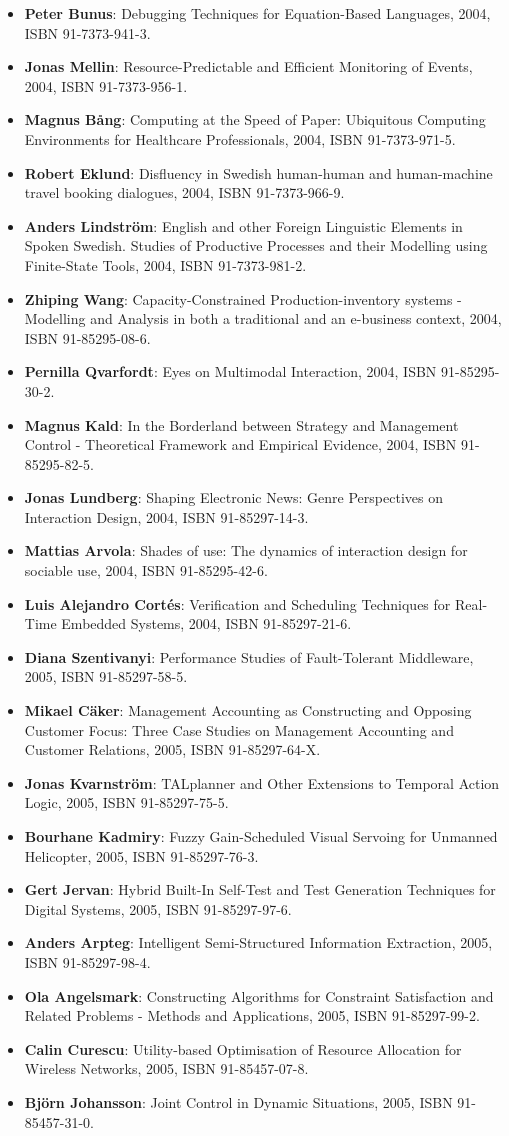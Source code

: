 \documentclass[a4paper,showtrims,twocolumn]{memoir}
\newenvironment{theses}
  {
    \begin{itemize}
      \setlength{\itemsep}{0.2em}
      \setlength{\parskip}{0em}
      \setlength{\parsep}{0em}
  }
  {
    \end{itemize}
  }
\newcommand{\thesis}[5]{\item[No. #1] \textbf{#2}: #3, #4, ISBN #5.}
\begin{document}
\begin{theses}
    \thesis{873}{Peter Bunus}{Debugging Techniques for Equation-Based Languages}{2004}{91-7373-941-3}
    \thesis{876}{Jonas Mellin}{Resource-Predictable and Efficient Monitoring of Events}{2004}{91-7373-956-1}
    \thesis{883}{Magnus Bång}{Computing at the Speed of Paper: Ubiquitous Computing Environments for Healthcare Professionals}{2004}{91-7373-971-5}
    \thesis{882}{Robert Eklund}{Disfluency in Swedish human-human and human-machine travel booking dialogues}{2004}{91-7373-966-9}
    \thesis{887}{Anders Lindström}{English and other Foreign Linguistic Elements in Spoken Swedish. Studies of Productive Processes and their Modelling using Finite-State Tools}{2004}{91-7373-981-2}
    \thesis{889}{Zhiping Wang}{Capacity-Constrained Production-inventory systems - Modelling and Analysis in both a traditional and an e-business context}{2004}{91-85295-08-6}
    \thesis{893}{Pernilla Qvarfordt}{Eyes on Multimodal Interaction}{2004}{91-85295-30-2}
    \thesis{910}{Magnus Kald}{In the Borderland between Strategy and Management Control - Theoretical Framework and Empirical Evidence}{2004}{91-85295-82-5}
    \thesis{918}{Jonas Lundberg}{Shaping Electronic News: Genre Perspectives on Interaction Design}{2004}{91-85297-14-3}
    \thesis{900}{Mattias Arvola}{Shades of use: The dynamics of interaction design for sociable use}{2004}{91-85295-42-6}
    \thesis{920}{Luis Alejandro Cortés}{Verification and Scheduling Techniques for Real-Time Embedded Systems}{2004}{91-85297-21-6}
    \thesis{929}{Diana Szentivanyi}{Performance Studies of Fault-Tolerant Middleware}{2005}{91-85297-58-5}
    \thesis{933}{Mikael Cäker}{Management Accounting as Constructing and Opposing Customer Focus: Three Case Studies on Management Accounting and Customer Relations}{2005}{91-85297-64-X}
    \thesis{937}{Jonas Kvarnström}{TALplanner and Other Extensions to Temporal Action Logic}{2005}{91-85297-75-5}
    \thesis{938}{Bourhane Kadmiry}{Fuzzy Gain-Scheduled Visual Servoing for Unmanned Helicopter}{2005}{91-85297-76-3}
    \thesis{945}{Gert Jervan}{Hybrid Built-In Self-Test and Test Generation Techniques for Digital Systems}{2005}{91-85297-97-6}
    \thesis{946}{Anders Arpteg}{Intelligent Semi-Structured Information Extraction}{2005}{91-85297-98-4}
    \thesis{947}{Ola Angelsmark}{Constructing Algorithms for Constraint Satisfaction and Related Problems - Methods and Applications}{2005}{91-85297-99-2}
    \thesis{963}{Calin Curescu}{Utility-based Optimisation of Resource Allocation for Wireless Networks}{2005}{91-85457-07-8}
    \thesis{972}{Björn Johansson}{Joint Control in Dynamic Situations}{2005}{91-85457-31-0}

\end{theses}
\end{document}
